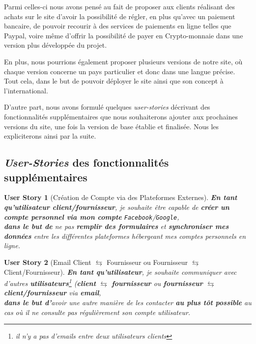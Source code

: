 \documentclass[a4paper,12pt]{book}
\theoremstyle{break}
\newtheorem*{userStory}{User Story}
\theoremstyle{break}
\theoremstyle{break}
\theoremstyle{break}
\theoremstyle{definition}
\theoremstyle{remark}
\begin{document}
Parmi celles-ci nous avons pensé au fait de proposer aux clients réalisant des achats sur le site d'avoir la possibilité de régler, en plus qu'avec un paiement bancaire, de pouvoir recourir à des services de paiements en ligne telles que Paypal, voire même d'offrir la possibilité de payer en Crypto-monnaie dans une version plus développée du projet.

En plus, nous pourrions également proposer plusieurs versions de notre site, où chaque version concerne un pays particulier et donc dans une langue précise. Tout cela, dans le but de pouvoir déployer le site ainsi que son concept à l'international.

D'autre part, nous avons formulé quelques \textit{user-stories} décrivant des fonctionnalités supplémentaires que nous souhaiterons ajouter aux prochaines versions du site, une fois la version de base établie et finalisée. Nous les expliciterons ainsi par la suite.
\subsection{\textit{User-Stories} des fonctionnalités supplémentaires}
\begin{userStory}[Création de Compte via des Plateformes Externes]
\textbf{En tant qu'utilisateur {\color{green}client}/{\color{red}fournisseur}}, je souhaite être capable de \textbf{créer un compte personnel via mon compte} \texttt{Facebook}/\texttt{Google},\\
\indent
\textbf{dans le but de} ne pas \textbf{remplir des formulaires} et \textbf{synchroniser mes données} entre les différentes plateformes hébergeant mes comptes personnels en ligne.
\end{userStory}

\begin{userStory}[Email Client $\leftrightarrows$ Fournisseur ou Fournisseur $\leftrightarrows$ Client/Fournisseur]
\textbf{En tant qu'utilisateur}, je souhaite communiquer avec d'autres \textbf{utilisateurs}\footnote{il n'y a pas d'emails entre deux utilisateurs {\color{green}clients}} (\textbf{{\color{green}client}} $\leftrightarrows$ \textbf{{\color{red}fournisseur}} ou \textbf{{\color{red}fournisseur}} $\leftrightarrows$ \textbf{{\color{green}client}/{\color{red}fournisseur}} via \textbf{email},\\
\indent
\textbf{dans le but d'}avoir une autre manière de les contacter \textbf{au plus tôt possible} au cas où il ne consulte pas régulièrement son compte utilisateur.
\end{userStory}
\end{document}
